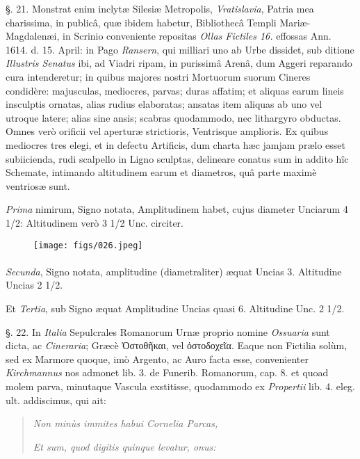 \documentclass[a4paper, 11pt, oneside, polutonikogreek, german]{article}
\begin{document}
§. 21. Monstrat enim inclytæ Silesiæ Metropolis, \emph{Vratislavia}, Patria mea charissima, in publicâ, quæ ibidem habetur, Bibliothecâ Templi Mariæ-Magdalenæi, in Scrinio conveniente repositas \emph{Ollas Fictiles 16.} effossas Ann. 1614. d. 15. April: in Pago \emph{Ransern}, qui milliari uno ab Urbe dissidet, sub ditione \emph{Illustris Senatus} ibi, ad Viadri ripam, in purissimâ Arenâ, dum Aggeri reparando cura intenderetur; in quibus majores nostri Mortuorum suorum Cineres condidère: majusculas, mediocres, parvas; duras affatim; et aliquas earum lineis insculptis ornatas, alias rudius elaboratas; ansatas item aliquas ab uno vel utroque latere; alias sine ansis; scabras quodammodo, nec lithargyro obductas. Omnes verò orificii vel aperturæ strictioris, Ventrisque amplioris. Ex quibus mediocres tres elegi, et in defectu Artificis, dum charta hæc jamjam prælo esset subiicienda, rudi scalpello in Ligno sculptas, delineare conatus sum in addito hîc Schemate, intimando altitudinem earum et diametros, quâ parte maximè ventriosæ sunt.

\emph{Prima} nimirum, Signo \astrosun notata, Amplitudinem habet, cujus diameter Unciarum 4 1/2: Altitudinem verò 3 1/2 Unc. circiter.
\begin{figure}[H]
\centering
\texttt{[image: figs/026.jpeg]}
\end{figure}
\paragraph{}

\emph{Secunda}, Signo \leftmoon notata, amplitudine (diametraliter) æquat Uncias 3. Altitudine Uncias 2 1/2.

Et \emph{Tertia}, sub Signo \EightStarTaper æquat Amplitudine Uncias quasi 6. Altitudine Unc. 2 1/2.

§. 22. In \emph{Italia} Sepulcrales Romanorum Urnæ proprio nomine \emph{Ossuaria} sunt dicta, ac \emph{Cineraria}; Græcè Ὀστοθῆκαι, vel ὀστοδοχεῖα. Eaque non Fictilia solùm, sed ex Marmore quoque, imò Argento, ac Auro facta esse, convenienter \emph{Kirchmannus} nos admonet lib. 3. de Funerib. Romanorum, cap. 8. et quoad molem parva, minutaque Vascula exstitisse, quodammodo ex \emph{Propertii} lib. 4. eleg. ult. addiscimus, qui ait:
\begin{quotation}
\emph{Non minùs immites habui Cornelia Parcas,}

\emph{Et sum, quod digitis quinque levatur, onus:}
\end{quotation}
\end{document}
